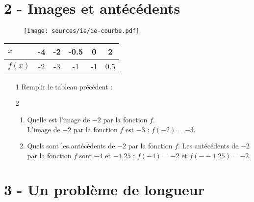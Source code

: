 \documentclass[11pt]{article}
\begin{document}
\noindent\hrulefill
\newpage
\section*{2 - Images et antécédents}

\begin{multicols}{2}

  \begin{figure}[H]
    \centering
    \texttt{[image: sources/ie/ie-courbe.pdf]}
  \end{figure}

  \begin{center}
    \begin{tabular}{| l || c | c | c | c | c |}
      \hline			
      $x$    & -4 & -2 & -0.5 & 0  & 2\\
      \hline  
      $f(x)$ & -2 & -3 & -1   & -1  & 0.5\\
      \hline  
    \end{tabular}
  \end{center}


  \begin{enumerate}
  \item[1] Remplir le tableau précédent :
  \item[2] 
    \begin{enumerate}
    \item Quelle est l'image de $-2$ par la fonction $f$.\\
  L'image de $-2$ par la fonction $f$ est $-3$ : $f(-2) = -3$.  
    \item Quels sont les antécédents de $-2$ par la fonction $f$.
    Les antécédents de $-2$ par la fonction $f$ sont $-4$ et $-1.25$ : $f(-4) = -2$ et $f(--1.25) = -2$.
    \end{enumerate}
  \end{enumerate}

\end{multicols}

\noindent\hrulefill

\section*{3 - Un problème de longueur }
\end{document}
